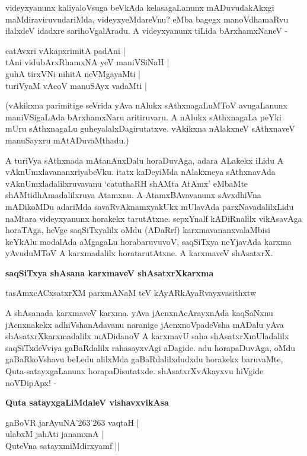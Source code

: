 \noindent
videyxyanunx kaliyaloVsuga beVkAda kelasagaLanunx mADuvudakAkxgi maMdiraviruvudariMda, videyx\-yeMdareVnu? eMba bagegx manoVdhamaRvu ilalxdeV idadxre sarihoVgalAradu. A videyxyanunx tiLida bArxhamxNaneV - 

\begin{shloka}
catAvxri vAkapxrimitA padAni |\\\label{86}
tAni vidubArxRhamxNA yeV maniVSiNaH |\\
guhA tirxVNi nihitA neVMgayaMti |\\
turiVyaM vAcoV manuSAyx vadaMti |
\end{shloka}

\noindent
(vAkikxna parimitige seVrida yAva nAlukx sAthxnagaLuMToV avugaLanunx maniVSi\-gaLAda bArxhamxNaru ari\-tiru\-varu. A nAlukx sAthxnagaLa peYki mUru sAthxnagaLu guhe\-yalalxDagirutatxve. vAkikxna nAlakxneV sAthxnaveV manuSayxru mAtADuvaMthadu.) 

A turiVya sAthxnada mAtanAnxDalu horaDuvAga, adara ALakekx iLidu A vAknUmxla\-vananxriyabeVku. itatx kaDeyiMda nAlakxneya sAthxnavAda vAknUmxladalilxruvavanu `catuthaRH shAMta AtAmx' eMbaMte shAMtidhAmadalilxruva Atamxnu. A AtamxBAvavanunx sAvxdhiVna mADikoMDu adariMda savaRvAknamxyakUkx mUlavAda parxNavadalilxLidu naMtara videyxyanunx horakekx tarutAtxne. sepxYnalf kADiR\-nalilx vikAsavAga horaTAga, heVge saqSiTxyalilx oMdu (ADaRrf) karxmavananxvalaMbisi keYkAlu moda\-lAda aMga\-gaLu horabaruvuvoV, saqSiTxya neYjavAda karxma yAvuduMToV A karxmadalilx horatarutAtxne. A karxmaveV shAsatxrX.

{\bigskip
\noindent
{\large\bf saqSiTxya shAsana karxmaveV shAsatxrXkarxma}}\label{page87}
\smallskip

\begin{shloka}
tasAmxcACxsatxrXM parxmANaM teV kAyARkAyaRvayxvasithxtw\label{87}
\end{shloka}

\noindent
A shAsanada karxmaveV karxma. yAva jAcnxnAcArayxnAda kaqSaNxnu jAcnxnakekx adhiVshanAdavanu naranige jAcnxnoV\-padeVsha mADalu yAva shAsatxrXkarxmadalilx mADidanoV A karxmavU saha shAsatxrXmUladalilx saqSiTxdeVviya gaBaR\-dalilx rahasayxvAgi aDagide. adu horapaDuvAga, oMdu gaBaRkoVshavu beLedu alilxMda gaBaRdalilx\-dudxdu horakekx baruvaMte, Quta-satayxgaLanunx horapaDisutatxde. shAsatxrXvAkayxvu hiVgide noVDipApx! - 

{\bigskip
\noindent
{\large\bf Quta satayxgaLiMdaleV vishavxvikAsa}}\label{page87}
\medskip

\begin{shloka}
gaBoVR jarAyuNA\char'263\char'263 vaqtaH |\\\label{87}
ulabxM ja{hA}ti janamxnA |\\
QuteVna satayxmiMdirxyamf ||
\end{shloka}

